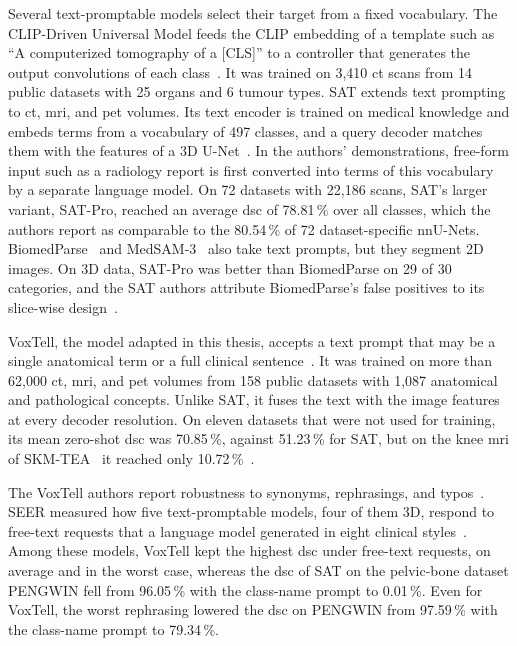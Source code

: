 Several text-promptable models select their target from a fixed vocabulary.
The CLIP-Driven Universal Model feeds the CLIP embedding of a template such as ``A computerized tomography of a [CLS]'' to a controller that generates the output convolutions of each class~\cite{Liu_2023}.
It was trained on 3{,}410 \gls{ct} scans from 14 public datasets with 25 organs and 6 tumour types.
SAT extends text prompting to \gls{ct}, \gls{mri}, and \gls{pet} volumes.
Its text encoder is trained on medical knowledge and embeds terms from a vocabulary of 497 classes, and a query decoder matches them with the features of a 3D U-Net~\cite{zhao2025sat}.
In the authors' demonstrations, free-form input such as a radiology report is first converted into terms of this vocabulary by a separate language model.
On 72 datasets with 22{,}186 scans, SAT's larger variant, SAT-Pro, reached an average \gls{dsc} of 78.81\,\% over all classes, which the authors report as comparable to the 80.54\,\% of 72 dataset-specific nnU-Nets.
BiomedParse~\cite{zhao2025foundation-9de} and MedSAM-3~\cite{liu2026medsam3delvingsegmentmedical} also take text prompts, but they segment 2D images.
On 3D data, SAT-Pro was better than BiomedParse on 29 of 30 categories, and the SAT authors attribute BiomedParse's false positives to its slice-wise design~\cite{zhao2025sat}.

VoxTell, the model adapted in this thesis, accepts a text prompt that may be a single anatomical term or a full clinical sentence~\cite{rokuss2025voxtellfreetextpromptableuniversal}.
It was trained on more than 62{,}000 \gls{ct}, \gls{mri}, and \gls{pet} volumes from 158 public datasets with 1{,}087 anatomical and pathological concepts.
Unlike SAT, it fuses the text with the image features at every decoder resolution.
On eleven datasets that were not used for training, its mean zero-shot \gls{dsc} was 70.85\,\%, against 51.23\,\% for SAT, but on the knee \gls{mri} of SKM-TEA~\cite{desai2021skmtea} it reached only 10.72\,\%~\cite[Suppl.~Table~9]{rokuss2025voxtellfreetextpromptableuniversal}.

The VoxTell authors report robustness to synonyms, rephrasings, and typos~\cite{rokuss2025voxtellfreetextpromptableuniversal}.
SEER measured how five text-promptable models, four of them 3D, respond to free-text requests that a language model generated in eight clinical styles~\cite{zhang2026seer}.
Among these models, VoxTell kept the highest \gls{dsc} under free-text requests, on average and in the worst case, whereas the \gls{dsc} of SAT on the pelvic-bone dataset PENGWIN fell from 96.05\,\% with the class-name prompt to 0.01\,\%.
Even for VoxTell, the worst rephrasing lowered the \gls{dsc} on PENGWIN from 97.59\,\% with the class-name prompt to 79.34\,\%.
